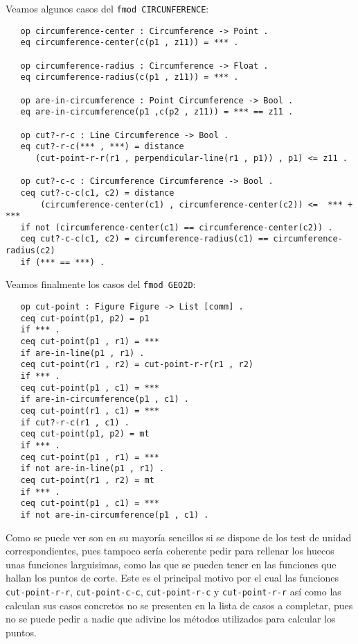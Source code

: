 Veamos algunos casos del \texttt{fmod CIRCUNFERENCE}: \par

{\codesize
\begin{verbatim}
   op circumference-center : Circumference -> Point .
   eq circumference-center(c(p1 , z11)) = *** .

   op circumference-radius : Circumference -> Float .
   eq circumference-radius(c(p1 , z11)) = *** .

   op are-in-circumference : Point Circumference -> Bool .
   eq are-in-circumference(p1 ,c(p2 , z11)) = *** == z11 .

   op cut?-r-c : Line Circumference -> Bool .
   eq cut?-r-c(*** , ***) = distance
      (cut-point-r-r(r1 , perpendicular-line(r1 , p1)) , p1) <= z11 .

   op cut?-c-c : Circumference Circumference -> Bool .
   ceq cut?-c-c(c1, c2) = distance
       (circumference-center(c1) , circumference-center(c2)) <=  *** + ***
   if not (circumference-center(c1) == circumference-center(c2)) . 
   ceq cut?-c-c(c1, c2) = circumference-radius(c1) == circumference-radius(c2)
   if (*** == ***) .
\end{verbatim}
}

Veamos finalmente los casos del \texttt{fmod GEO2D}: \par

{\codesize
\begin{verbatim}
   op cut-point : Figure Figure -> List [comm] .
   ceq cut-point(p1, p2) = p1
   if *** .
   ceq cut-point(p1 , r1) = ***
   if are-in-line(p1 , r1) .
   ceq cut-point(r1 , r2) = cut-point-r-r(r1 , r2)
   if *** .
   ceq cut-point(p1 , c1) = ***
   if are-in-circumference(p1 , c1) .
   ceq cut-point(r1 , c1) = ***
   if cut?-r-c(r1 , c1) .
   ceq cut-point(p1, p2) = mt
   if *** .	
   ceq cut-point(p1 , r1) = ***
   if not are-in-line(p1 , r1) .
   ceq cut-point(r1 , r2) = mt 
   if *** .
   ceq cut-point(p1 , c1) = ***
   if not are-in-circumference(p1 , c1) .
\end{verbatim}
}

Como se puede ver son en su mayoría sencillos si se dispone de los test de unidad correspondientes, pues tampoco sería coherente pedir para rellenar los huecos unas funciones larguisimas, como las que se pueden tener en las funciones que hallan los puntos de corte. Este es el principal motivo por el cual las funciones \texttt{cut-point-r-r}, \texttt{cut-point-c-c}, \texttt{cut-point-r-c} y \texttt{cut-point-r-r} así como las calculan sus casos concretos no se presenten en la lista de casos a completar, pues no se puede pedir a nadie que adivine los métodos utilizados para calcular los puntos. \par
